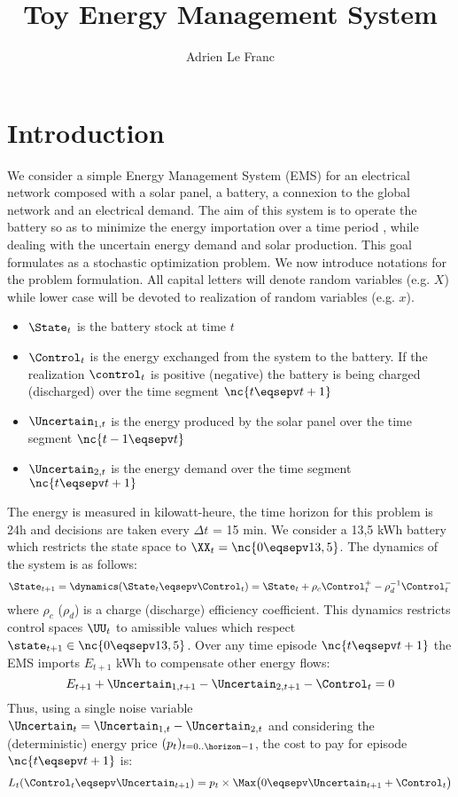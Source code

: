 \documentclass[10pt,a4paper]{article}
\begin{document}
\title{\textbf{Toy Energy Management System}}
\author{Adrien Le Franc}
\date{}
\maketitle

\section{Introduction}

We consider a simple Energy Management System (EMS) for an electrical network composed with a solar panel, a battery, a connexion to the global network and an electrical demand. The aim of this system is to operate the battery so as to minimize the energy importation over a time period \horizon, while dealing with the uncertain energy demand and solar production. This goal formulates as a stochastic optimization problem. We now introduce notations for the problem formulation. All capital letters will denote random variables (e.g. $X$) while lower case will be devoted to realization of random variables (e.g. $x$).

\begin{itemize}
\item $\State_t$ is the battery stock at time $t$
\item $\Control_t$ is the energy exchanged from the system to the battery. If the realization $\control_t$ is positive (negative) the battery is being charged (discharged) over the time segment $\nc{t \eqsepv t+1}$
\item $\Uncertain_{1, t}$ is the energy produced by the solar panel over the time segment $\nc{t-1 \eqsepv t}$
\item $\Uncertain_{2, t}$ is the energy demand over the time segment $\nc{t \eqsepv t+1}$
\end{itemize}

\noindent The energy is measured in kilowatt-heure, the time horizon for this problem is 24h and decisions are taken every $\Delta t$ = 15 min. We consider a 13,5 kWh battery which restricts the state space to $\XX_t = \nc{0 \eqsepv 13,5}$. The dynamics of the system is as follows:
\[\State_{t+1} =  \dynamics(\State_t \eqsepv \Control_t) = \State_t + \rho_c \Control_t^+ - \rho_d^{-1} \Control_t^-\]
where $\rho_c$ ($\rho_d$) is a charge (discharge) efficiency coefficient. This dynamics restricts control spaces $\UU_t$ to amissible values which respect $\state_{t+1} \in \nc{0 \eqsepv 13,5}$. Over any time episode $\nc{t \eqsepv t+1}$ the EMS imports $E_{t+1}$ kWh to compensate other energy flows:
\[E_{t+1} + \Uncertain_{1, t+1} - \Uncertain_{2, t+1} - \Control_t = 0\]
Thus, using a single noise variable $\Uncertain_t = \Uncertain_{1, t} - \Uncertain_{2, t}$ and considering the (deterministic) energy price $(p_t)_{t=0..\horizon-1}$, the cost to pay for episode $\nc{t \eqsepv t+1}$ is:
\[L_t(\Control_t \eqsepv \Uncertain_{t+1}) = p_t \times \Max \big(0 \eqsepv \Uncertain_{t+1} + \Control_t \big)\]
\end{document}

